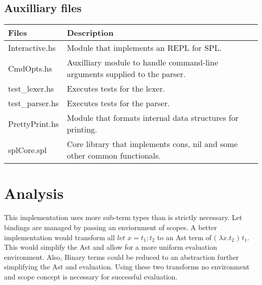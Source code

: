 \documentclass{article}
\begin{document}
\subsection{Auxilliary files}
\begin{tabular}{|l|l|}
  \hline
{\bf Files}&{\bf Description}\\
  \hline
Interactive.hs & Module that implements an REPL for SPL.\\
  \hline
CmdOpts.hs & Auxilliary module to handle command-line arguments supplied to the parser.\\
  \hline
test_lexer.hs & Executes tests for the lexer.\\
  \hline
test_parser.hs & Executes tests for the parser.\\
  \hline
PrettyPrint.hs & Module that formats internal data structures for printing.\\
  \hline
splCore.spl & Core library that implements cons, nil and some other common functionals.\\
  \hline
\end{tabular}

\section{Analysis}
This implementation uses more sub-term types than is strictly necessary. Let bindings
are managed by passing an enviornment of scopes. A better implementation would transform all
$let$ $x = t_1 ; t_2$ to an Ast term of $($ $\lambda x.t_2$ $)$ $t_1$. This would simplify the Ast
and allow for a more uniform evaluation environment. Also, Binary terms could be reduced to an
abstraction further simplifying the Ast and evaluation. Using these two transforms no environment
and scope concept is necessary for successful evaluation.
\end{document}
